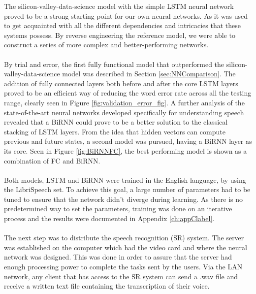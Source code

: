 The silicon-valley-data-science model with the simple 
LSTM neural network proved to be a strong starting point 
for our own neural networks. As it was used to get 
acquainted with all the different dependencies and 
intricacies that these systems possess.
By reverse engineering the reference model,
we were able to construct a series of more complex
and better-performing networks.\\\\ 
By trial and error, the first fully functional model 
that outperformed the silicon-valley-data-science model 
was described in Section \ref{sec:NNComparison}.
The addition of fully connected layers both before
and after the core LSTM layers proved to be an
efficient way of reducing the word error rate across
all the testing range, clearly seen in Figure 
\ref{fig:validation_error_fig}.
A further analysis of the state-of-the-art neural 
networks developed specifically for understanding
speech revealed that a BiRNN could prove to be a better 
solution to the classical stacking of LSTM layers.
From the idea that hidden vectors can compute
previous and future states, a second model was pursued,
having a BiRNN layer as its core.
Seen in Figure \ref{fig:BiRNNFC}, the best performing 
model is shown as a combination of FC and BiRNN.\\\\
Both models, LSTM and BiRNN were trained in the English 
language, by using the LibriSpeech set.
To achieve this goal, a large number of parameters had 
to be tuned to ensure that the network didn't diverge 
during learning.
As there is no predetermined way to set the parameters, 
training was done on an iterative process and the 
results were documented in Appendix
\ref{ch:appClabel}.\\\\
The next step was to distribute the speech recognition 
(SR) system.
The server was established on the computer which
had the video card and where the neural
network was designed.
This was done in order to assure that the server had
enough processing power to complete the tasks sent by
the users.
Via the LAN network, any client that has access
to the SR system can send a .wav
file and receive a written text file containing the
transcription of their voice.
